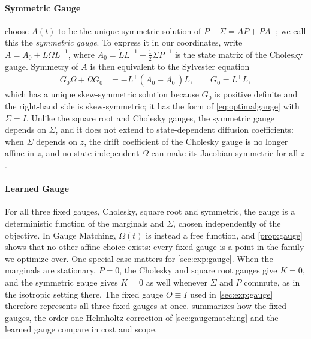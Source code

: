 \documentclass{article} %
\newcommand{\gauge}{\Omega}
\begin{document}
\paragraph{Symmetric Gauge}
\citet{course2023amortized,course2023state} choose $A(t)$ to be the unique symmetric solution of $\dot P - \Sigma = A P + P A^\top$; we call this the \emph{symmetric gauge}. To express it in our coordinates, write $A = A_0 + L \gauge L^{-1}$, where $A_0 = \dot L L^{-1} - \frac{1}{2} \Sigma P^{-1}$ is the state matrix of the Cholesky gauge. Symmetry of $A$ is then equivalent to the Sylvester equation
\begin{align*}
    G_0 \gauge + \gauge G_0 &= -L^\top (A_0 - A_0^\top) L, \qquad G_0 = L^\top L,
\end{align*}
which has a unique skew-symmetric solution because $G_0$ is positive definite and the right-hand side is skew-symmetric; it has the form of \cref{eq:optimalgauge} with $\Sigma = I$. Unlike the square root and Cholesky gauges, the symmetric gauge depends on $\Sigma$, and it does not extend to state-dependent diffusion coefficients: when $\Sigma$ depends on $z$, the drift coefficient of the Cholesky gauge is no longer affine in $z$, and no state-independent $\gauge$ can make its Jacobian symmetric for all $z$ \citep{smith2026closing}.

\paragraph{Learned Gauge}
For all three fixed gauges, Cholesky, square root and symmetric, the gauge is a deterministic function of the marginals and $\Sigma$, chosen independently of the objective. In Gauge Matching, $\gauge(t)$ is instead a free function, and \cref{prop:gauge} shows that no other affine choice exists: every fixed gauge is a point in the family we optimize over. One special case matters for \cref{sec:exp:gauge}. When the marginals are stationary, $\dot P = 0$, the Cholesky and square root gauges give $K = 0$, and the symmetric gauge gives $K = 0$ as well whenever $\Sigma$ and $P$ commute, as in the isotropic setting there. The fixed gauge $O \equiv I$ used in \cref{sec:exp:gauge} therefore represents all three fixed gauges at once.  summarizes how the fixed gauges, the order-one Helmholtz correction of \cref{sec:gaugematching} and the learned gauge compare in cost and scope.
\end{document}
